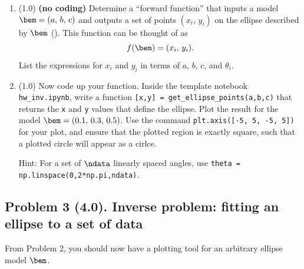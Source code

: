 \documentclass[11pt,titlepage,fleqn]{article}
\newcommand{\tfile}{{\tt hw\_inv.ipynb}}
\begin{document}
\begin{enumerate}
\item (1.0) {\bf (no coding)} Determine a ``forward function'' that inputs a model $\bem = (a,\,b,\,c)$ and outputs a set of points $(x_i,\,y_i)$ on the ellipse described by $\bem$ (). This function can be thought of as
%
\begin{equation}
f(\bem) = (x_i,\,y_i).
\end{equation}
%
List the expressions for $x_i$ and $y_i$ in terms of $a$, $b$, $c$, and $\theta_i$.

\item (1.0) Now code up your function.
Inside the template notebook \tfile, write a function \verb+[x,y] = get_ellipse_points(a,b,c)+ that returns the \verb+x+ and \verb+y+ values that define the ellipse. Plot the result for the model $\bem = (0.1,\,0.3,\,0.5)$. Use the command \verb+plt.axis([-5, 5, -5, 5])+ for your plot, and ensure that the plotted region is exactly square, such that a plotted circle will appear as a cirlce.

Hint: For a set of $\ndata$ linearly spaced angles, use \verb+theta = np.linspace(0,2*np.pi,ndata)+.

\end{enumerate}


\pagebreak
\subsection*{Problem 3 (4.0). Inverse problem: fitting an ellipse to a set of data}

From Problem 2, you should now have a plotting tool for an arbitrary ellipse model $\bem$.
\end{document}
